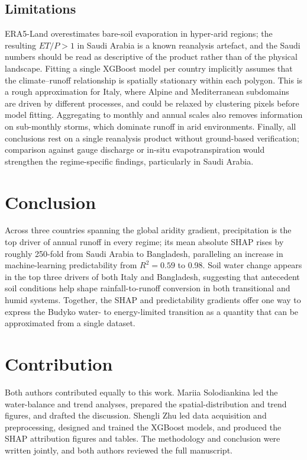 \documentclass[11pt]{article}
\begin{document}
\subsection{Limitations}

ERA5-Land overestimates bare-soil evaporation in hyper-arid regions; the resulting $ET/P > 1$ in Saudi Arabia is a known reanalysis artefact, and the Saudi numbers should be read as descriptive of the product rather than of the physical landscape. Fitting a single XGBoost model per country implicitly assumes that the climate--runoff relationship is spatially stationary within each polygon. This is a rough approximation for Italy, where Alpine and Mediterranean subdomains are driven by different processes, and could be relaxed by clustering pixels before model fitting. Aggregating to monthly and annual scales also removes information on sub-monthly storms, which dominate runoff in arid environments. Finally, all conclusions rest on a single reanalysis product without ground-based verification; comparison against gauge discharge or in-situ evapotranspiration would strengthen the regime-specific findings, particularly in Saudi Arabia.

\section{Conclusion}

Across three countries spanning the global aridity gradient, precipitation is the top driver of annual runoff in every regime; its mean absolute SHAP rises by roughly 250-fold from Saudi Arabia to Bangladesh, paralleling an increase in machine-learning predictability from $R^2 = 0.59$ to 0.98. Soil water change appears in the top three drivers of both Italy and Bangladesh, suggesting that antecedent soil conditions help shape rainfall-to-runoff conversion in both transitional and humid systems. Together, the SHAP and predictability gradients offer one way to express the Budyko water- to energy-limited transition as a quantity that can be approximated from a single dataset.

\section{Contribution}

Both authors contributed equally to this work. Mariia Solodiankina led the water-balance and trend analyses, prepared the spatial-distribution and trend figures, and drafted the discussion. Shengli Zhu led data acquisition and preprocessing, designed and trained the XGBoost models, and produced the SHAP attribution figures and tables. The methodology and conclusion were written jointly, and both authors reviewed the full manuscript.
\end{document}
